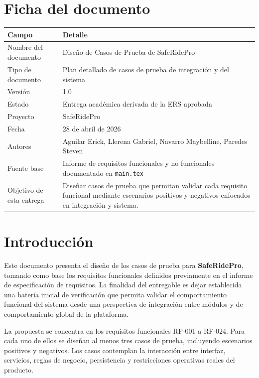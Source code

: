 \documentclass[12pt]{article}
\begin{document}
\clearpage
{}
\tableofcontents
\newpage

\section*{Ficha del documento}

\begin{longtable}{|P{3.2cm}|P{11.2cm}|}
\hline
{}
\textbf{Campo} & \textbf{Detalle} \\
\hline
Nombre del documento & Dise\~no de Casos de Prueba de SafeRidePro \\
\hline
Tipo de documento & Plan detallado de casos de prueba de integraci\'on y del sistema \\
\hline
Versi\'on & 1.0 \\
\hline
Estado & Entrega acad\'emica derivada de la ERS aprobada \\
\hline
Proyecto & SafeRidePro \\
\hline
Fecha & 28 de abril de 2026 \\
\hline
Autores & Aguilar Erick, Llerena Gabriel, Navarro Maybelline, Paredes Steven \\
\hline
Fuente base & Informe de requisitos funcionales y no funcionales documentado en \texttt{main.tex} \\
\hline
Objetivo de esta entrega & Dise\~nar casos de prueba que permitan validar cada requisito funcional mediante escenarios positivos y negativos enfocados en integraci\'on y sistema. \\
\hline
\end{longtable}

\newpage
{}

\section{Introducci\'on}

Este documento presenta el dise\~no de los casos de prueba para \textbf{SafeRidePro}, tomando como base los requisitos funcionales definidos previamente en el informe de especificaci\'on de requisitos. La finalidad del entregable es dejar establecida una bater\'ia inicial de verificaci\'on que permita validar el comportamiento funcional del sistema desde una perspectiva de integraci\'on entre m\'odulos y de comportamiento global de la plataforma.

La propuesta se concentra en los requisitos funcionales RF-001 a RF-024. Para cada uno de ellos se dise\~nan al menos tres casos de prueba, incluyendo escenarios positivos y negativos. Los casos contemplan la interacci\'on entre interfaz, servicios, reglas de negocio, persistencia y restricciones operativas reales del producto.
\end{document}
